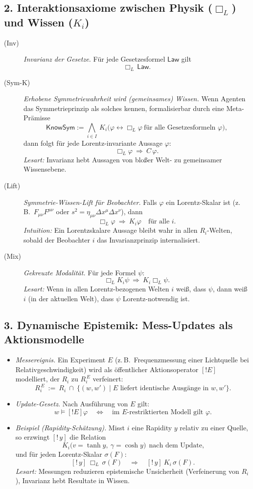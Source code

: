 \documentclass[10pt, letterpaper]{article}
\begin{document}
\subsection*{2. Interaktionsaxiome zwischen Physik ($\Box_L$) und Wissen ($K_i$)}
\begin{description}
\item[(Inv)] \emph{Invarianz der Gesetze.} Für jede Gesetzesformel $\mathsf{Law}$ gilt
\[
\Box_L\,\mathsf{Law}.
\]
\item[(Sym-K)] \emph{Erhobene Symmetriewahrheit wird (gemeinsames) Wissen.} Wenn Agenten das Symmetrieprinzip als solches kennen, formalisierbar durch eine Meta-Prämisse
\[
\mathsf{KnowSym}:=\bigwedge_{i\in I}\ K_i\big(\varphi\leftrightarrow \Box_L\varphi\ \text{für alle Gesetzesformeln }\varphi\big),
\]
dann folgt für jede Lorentz-invariante Aussage $\varphi$:
\[
\Box_L\varphi\ \Longrightarrow\ C\,\varphi.
\]
\emph{Lesart:} Invarianz hebt Aussagen von bloßer Welt- zu gemeinsamer Wissensebene.

\item[(Lift)] \emph{Symmetrie-Wissen-Lift für Beobachter.} Falls $\varphi$ ein Lorentz-Skalar ist (z.\,B.\ $F_{\mu\nu}F^{\mu\nu}$ oder $s^2=\eta_{\mu\nu}\Delta x^\mu\Delta x^\nu$), dann
\[
\Box_L\varphi\ \Rightarrow\ K_i\varphi\quad\text{für alle }i.
\]
\emph{Intuition:} Ein Lorentzskalare Aussage bleibt wahr in allen $R_i$-Welten, sobald der Beobachter $i$ das Invarianzprinzip internalisiert.

\item[(Mix)] \emph{Gekreuzte Modalität.} Für jede Formel $\psi$:
\[
\Box_L K_i\psi\ \Longrightarrow\ K_i\Box_L\psi.
\]
\emph{Lesart:} Wenn in allen Lorentz-bezogenen Welten $i$ weiß, dass $\psi$, dann weiß $i$ (in der aktuellen Welt), dass $\psi$ Lorentz-notwendig ist.
\end{description}

\subsection*{3. Dynamische Epistemik: Mess-Updates als Aktionsmodelle}
\begin{itemize}
\item \emph{Messereignis.} Ein Experiment $E$ (z.\,B.\ Frequenzmessung einer Lichtquelle bei Relativgeschwindigkeit) wird als öffentlicher Aktionsoperator $[!E]$ modelliert, der $R_i$ zu $R_i^{\,E}$ verfeinert:
\[
R_i^{\,E}\ :=\ R_i\ \cap\ \{(w,w')\mid \text{$E$ liefert identische Ausgänge in $w,w'$}\}.
\]
\item \emph{Update-Gesetz.} Nach Ausführung von $E$ gilt:
\[
w \models [!E]\varphi\quad\Longleftrightarrow\quad \text{im $E$-restriktierten Modell gilt }\varphi.
\]
\item \emph{Beispiel (Rapidity-Schätzung).} Misst $i$ eine Rapidity $y$ relativ zu einer Quelle, so erzwingt $[!\,y]$ die Relation
\[
K_i\big(v=\tanh y,\ \gamma=\cosh y\big)\ \ \text{nach dem Update,}
\]
und für jeden Lorentz-Skalar $\sigma(F)$:
\[
[!\,y]\ \Box_L\,\sigma(F)\quad\Rightarrow\quad [!\,y]\ K_i\,\sigma(F).
\]
\emph{Lesart:} Messungen reduzieren epistemische Unsicherheit (Verfeinerung von $R_i$), Invarianz hebt Resultate in Wissen.
\end{itemize}
\end{document}
